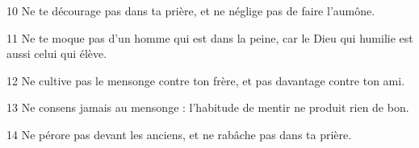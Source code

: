 
10 Ne te décourage pas dans ta prière, et ne néglige pas de faire l’aumône.

11 Ne te moque pas d’un homme qui est dans la peine, car le Dieu qui humilie est aussi celui qui élève.

12 Ne cultive pas le mensonge contre ton frère, et pas davantage contre ton ami.

13 Ne consens jamais au mensonge : l’habitude de mentir ne produit rien de bon.

14 Ne pérore pas devant les anciens, et ne rabâche pas dans ta prière.